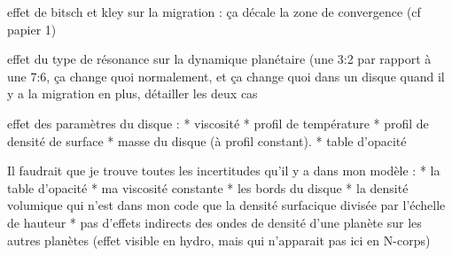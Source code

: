\documentclass[a4paper,twoside]{article}
\begin{document}
effet de bitsch et kley sur la migration : ça décale la zone de convergence (cf papier 1)

effet du type de résonance sur la dynamique planétaire (une 3:2 par rapport à une 7:6, ça change quoi normalement, et ça change quoi dans un disque quand il y a la migration en plus, détailler les deux cas



effet des paramètres du disque : 
* viscosité
* profil de température
* profil de densité de surface
* masse du disque (à profil constant). 
* table d'opacité

Il faudrait que je trouve toutes les incertitudes qu'il y a dans mon modèle : 
* la table d'opacité
* ma viscosité constante
* les bords du disque
* la densité volumique qui n'est dans mon code que la densité surfacique divisée par l'échelle de hauteur
* pas d'effets indirects des ondes de densité d'une planète sur les autres planètes (effet visible en hydro, mais qui n'apparait pas ici en N-corps)
\end{document}
